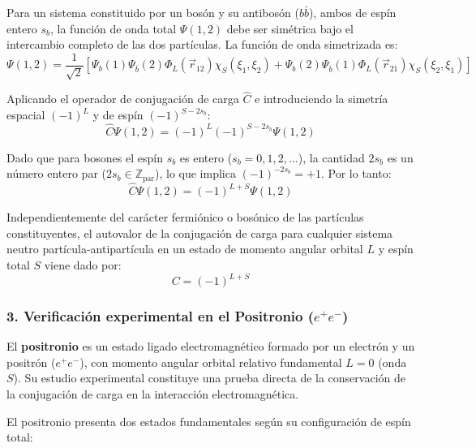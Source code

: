Para un sistema constituido por un bosón y su antibosón ($b\bar{b}$), ambos de espín entero $s_b$, la función de onda total $\Psi(1,2)$ debe ser simétrica bajo el intercambio completo de las dos partículas. La función de onda simetrizada es:
\begin{equation}
    \Psi(1,2) = \frac{1}{\sqrt{2}} \left[ \Psi_b(1) \Psi_{\bar{b}}(2) \Phi_L(\vec{r}_{12}) \chi_S(\xi_1, \xi_2) + \Psi_b(2) \Psi_{\bar{b}}(1) \Phi_L(\vec{r}_{21}) \chi_S(\xi_2, \xi_1) \right]
\end{equation}

Aplicando el operador de conjugación de carga $\hat{C}$ e introduciendo la simetría espacial $(-1)^L$ y de espín $(-1)^{S - 2s_b}$:
\begin{equation}
    \hat{C} \Psi(1,2) = (-1)^L (-1)^{S - 2s_b} \Psi(1,2)
\end{equation}

Dado que para bosones el espín $s_b$ es entero ($s_b = 0, 1, 2, \dots$), la cantidad $2s_b$ es un número entero par ($2s_b \in \mathbb{Z}_{\text{par}}$), lo que implica $(-1)^{-2s_b} = +1$. Por lo tanto:
\begin{equation}
    \hat{C} \Psi(1,2) = (-1)^{L+S} \Psi(1,2)
\end{equation}

\begin{concepto}
Independientemente del carácter fermiónico o bosónico de las partículas constituyentes, el autovalor de la conjugación de carga para cualquier sistema neutro partícula-antipartícula en un estado de momento angular orbital $L$ y espín total $S$ viene dado por:
\begin{equation}
    C = (-1)^{L+S}
\end{equation}
\end{concepto}

\subsubsection*{3. Verificación experimental en el Positronio ($e^+ e^-$)}

El \textbf{positronio} es un estado ligado electromagnético formado por un electrón y un positrón ($e^+ e^-$), con momento angular orbital relativo fundamental $L = 0$ (onda $S$). Su estudio experimental constituye una prueba directa de la conservación de la conjugación de carga en la interacción electromagnética.

El positronio presenta dos estados fundamentales según su configuración de espín total:

